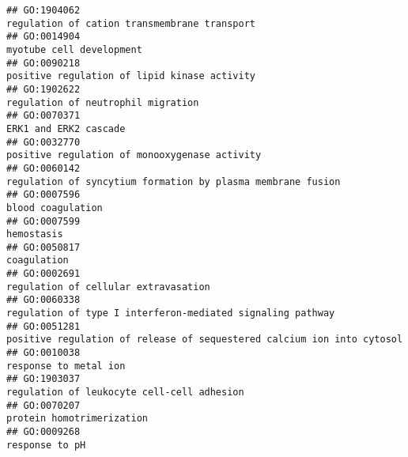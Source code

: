 \documentclass[
]{article}
\begin{document}
\begin{verbatim}
## GO:1904062                                                                                                     regulation of cation transmembrane transport
## GO:0014904                                                                                                                         myotube cell development
## GO:0090218                                                                                                     positive regulation of lipid kinase activity
## GO:1902622                                                                                                               regulation of neutrophil migration
## GO:0070371                                                                                                                            ERK1 and ERK2 cascade
## GO:0032770                                                                                                    positive regulation of monooxygenase activity
## GO:0060142                                                                                      regulation of syncytium formation by plasma membrane fusion
## GO:0007596                                                                                                                                blood coagulation
## GO:0007599                                                                                                                                       hemostasis
## GO:0050817                                                                                                                                      coagulation
## GO:0002691                                                                                                             regulation of cellular extravasation
## GO:0060338                                                                                       regulation of type I interferon-mediated signaling pathway
## GO:0051281                                                                           positive regulation of release of sequestered calcium ion into cytosol
## GO:0010038                                                                                                                            response to metal ion
## GO:1903037                                                                                                       regulation of leukocyte cell-cell adhesion
## GO:0070207                                                                                                                        protein homotrimerization
## GO:0009268                                                                                                                                   response to pH

\end{verbatim}
\end{document}

